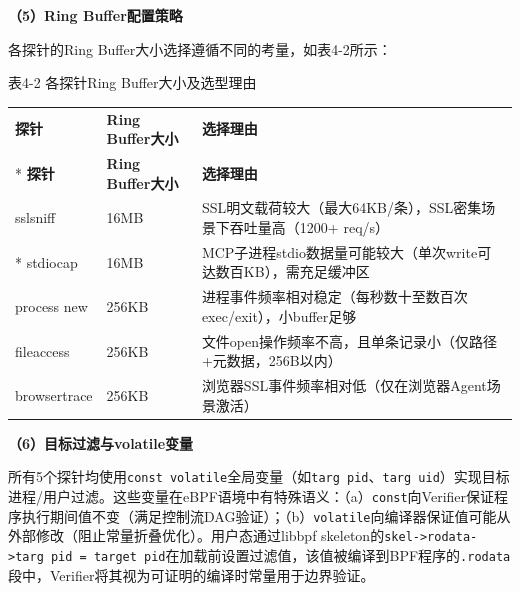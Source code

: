 \documentclass[a4paper]{ctexart}
\makeatletter
\renewcommand{\_}{%
  \ifmmode
    \nfss@text{\textunderscore}%
  \else
    \textunderscore\discretionary{}{}{}%
  \fi}
\makeatother
\begin{document}
\textbf{（5）Ring Buffer配置策略}


各探针的Ring Buffer大小选择遵循不同的考量，如表4-2所示：




\medskip

\medskip
{\centering\small
表4-2 各探针Ring Buffer大小及选型理由\par
\vspace{3pt}

\setlength{\tabcolsep}{6pt}
\renewcommand{\arraystretch}{1.1}

\begin{longtable}{p{4.5cm} >{\raggedright\arraybackslash}p{4.5cm} >{\raggedright\arraybackslash}p{4.5cm}}
\hline
\textbf{探针} & \textbf{Ring Buffer大小} & \textbf{选择理由} \\*
\hline
\endfirsthead
\hline
\textbf{探针} & \textbf{Ring Buffer大小} & \textbf{选择理由} \\
\hline
\endhead
\hline
\endfoot
\hline
\endlastfoot

sslsniff & 16MB & SSL明文载荷较大（最大64KB/条），SSL密集场景下吞吐量高（1200+ req/s） \\*
\hline
stdiocap & 16MB & MCP子进程stdio数据量可能较大（单次write可达数百KB），需充足缓冲区 \\
\hline
process\_new & 256KB & 进程事件频率相对稳定（每秒数十至数百次exec/exit），小buffer足够 \\
\hline
fileaccess & 256KB & 文件open操作频率不高，且单条记录小（仅路径+元数据，256B以内） \\
\hline
browsertrace & 256KB & 浏览器SSL事件频率相对低（仅在浏览器Agent场景激活） \\
\hline
\end{longtable}
\par}



\textbf{（6）目标过滤与volatile变量}


所有5个探针均使用\texttt{const volatile}全局变量（如\texttt{targ\_pid}、\texttt{targ\_uid}）实现目标进程/用户过滤。这些变量在eBPF语境中有特殊语义：（a）\texttt{const}向Verifier保证程序执行期间值不变（满足控制流DAG验证）；（b）\texttt{volatile}向编译器保证值可能从外部修改（阻止常量折叠优化）。用户态通过libbpf skeleton的\texttt{skel->rodata->targ\_pid = target\_pid}在加载前设置过滤值，该值被编译到BPF程序的\texttt{.rodata}段中，Verifier将其视为可证明的编译时常量用于边界验证。
\end{document}
